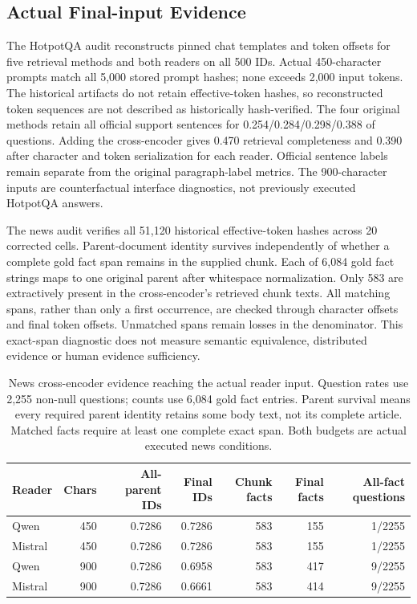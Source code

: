 \FloatBarrier
\subsection{Actual Final-input Evidence}
The HotpotQA audit reconstructs pinned chat templates and token offsets for five retrieval methods and both readers on all 500 IDs. Actual 450-character prompts match all 5,000 stored prompt hashes; none exceeds 2,000 input tokens. The historical artifacts do not retain effective-token hashes, so reconstructed token sequences are not described as historically hash-verified. The four original methods retain all official support sentences for 0.254/0.284/0.298/0.388 of questions. Adding the cross-encoder gives 0.470 retrieval completeness and 0.390 after character and token serialization for each reader. Official sentence labels remain separate from the original paragraph-label metrics. The 900-character inputs are counterfactual interface diagnostics, not previously executed HotpotQA answers.

The news audit verifies all 51,120 historical effective-token hashes across 20 corrected cells. Parent-document identity survives independently of whether a complete gold fact span remains in the supplied chunk. Each of 6,084 gold fact strings maps to one original parent after whitespace normalization. Only 583 are extractively present in the cross-encoder's retrieved chunk texts. All matching spans, rather than only a first occurrence, are checked through character offsets and final token offsets. Unmatched spans remain losses in the denominator. This exact-span diagnostic does not measure semantic equivalence, distributed evidence or human evidence sufficiency.

\begin{table}[htbp]
\centering\footnotesize
\caption{News cross-encoder evidence reaching the actual reader input. Question rates use 2,255 non-null questions; counts use 6,084 gold fact entries. Parent survival means every required parent identity retains some body text, not its complete article. Matched facts require at least one complete exact span. Both budgets are actual executed news conditions.}
\label{tab:priority_news_token_retention}
\begin{tabularx}{\textwidth}{l r r r r r r}
\toprule
Reader & Chars & All-parent IDs & Final IDs & Chunk facts & Final facts & All-fact questions \\
\midrule
Qwen & 450 & 0.7286 & 0.7286 & 583 & 155 & 1/2255 \\
Mistral & 450 & 0.7286 & 0.7286 & 583 & 155 & 1/2255 \\
Qwen & 900 & 0.7286 & 0.6958 & 583 & 417 & 9/2255 \\
Mistral & 900 & 0.7286 & 0.6661 & 583 & 414 & 9/2255 \\
\bottomrule
\end{tabularx}
\end{table}

